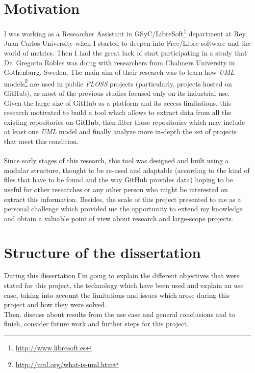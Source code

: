 \documentclass[a4paper, 12pt]{book}
\begin{document}
\section{Motivation}
\label{sec:motivation}
I was working as a Researcher Assistant in GSyC/LibreSoft\footnote{\url{http://www.libresoft.es}} department at Rey Juan Carlos University when I started to
deepen into Free/Libre software and the world of metrics. Then I had the great luck of start participating in a study that
Dr. Gregorio Robles was doing with researchers from Chalmers University in Gothenburg, Sweden. The main aim of their research was to
learn how \emph{UML} models\footnote{\url{http://uml.org/what-is-uml.htm}} are used in public \emph{FLOSS} projects (particularly, projects hosted on GitHub),
as most of the previous studies focused only on its industrial use.\\
Given the large size of GitHub as a platform and its access limitations, this research motivated to build a tool which allows to
extract data from all the existing repositories on GitHub, then filter those repositories which may include at least one
\emph{UML} model and finally analyze more in-depth the set of projects that meet this condition.\\\\
Since early stages of this research, this tool was designed and built using a modular structure, thought to be re-used
and adaptable (according to the kind of files that have to be found and the way GitHub provides data) hoping to be useful
for other researches or any other person who might be interested on extract this information. Besides, the scale of this project
presented to me as a personal challenge which provided me the opportunity to extend my knowledge and obtain a valuable point of
view about research and large-scope projects.

\section{Structure of the dissertation}
\label{sec:estructura}
During this dissertation I'm going to explain the different objectives that were stated for this project, the technology
which have been used and explain an use case, taking into account the limitations and issues which arose
during this project and how they were solved.\\Then, discuss about results from the use case and general conclusions
and to finish, consider future work and further steps for this project.
\cleardoublepage
\end{document}
